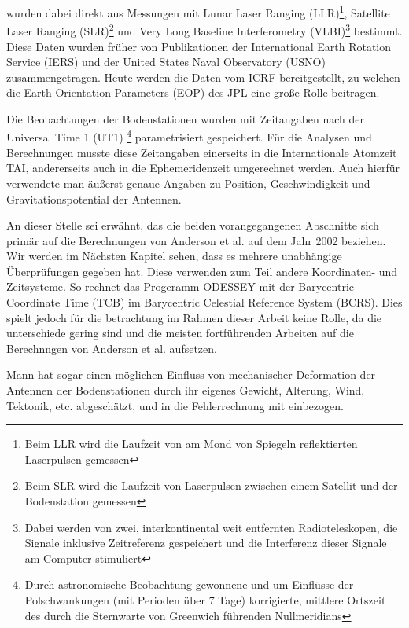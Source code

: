 wurden dabei direkt aus Messungen mit Lunar Laser Ranging (LLR)\footnote{Beim LLR wird die Laufzeit von am Mond von Spiegeln reflektierten Laserpulsen gemessen},
Satellite Laser Ranging (SLR)\footnote{Beim SLR wird die Laufzeit von Laserpulsen zwischen einem Satellit und der Bodenstation gemessen} und Very Long Baseline Interferometry
(VLBI)\footnote{Dabei werden von zwei, interkontinental weit entfernten Radioteleskopen, die Signale inklusive
Zeitreferenz gespeichert und die Interferenz dieser Signale am Computer stimuliert} bestimmt.
Diese Daten wurden früher von Publikationen der International Earth Rotation Service (IERS) und der United States Naval Observatory (USNO) zusammengetragen. Heute werden die Daten vom ICRF bereitgestellt, zu welchen die Earth Orientation Parameters
(EOP) des JPL eine große Rolle beitragen.\cite{Anderson2002}

Die Beobachtungen der Bodenstationen wurden mit Zeitangaben nach der Universal Time 1 (UT1)
\footnote{Durch astronomische Beobachtung gewonnene und um Einflüsse der Polschwankungen (mit Perioden über 7 Tage) korrigierte, mittlere Ortszeit des durch die Sternwarte von Greenwich führenden Nullmeridians}
parametrisiert gespeichert. Für die Analysen und
Berechnungen musste diese Zeitangaben einerseits in die Internationale Atomzeit TAI, andererseits auch in die
Ephemeridenzeit umgerechnet werden. Auch hierfür verwendete man äußerst genaue Angaben zu Position, Geschwindigkeit und
Gravitationspotential der Antennen.\cite{Dittus2006} %

An dieser Stelle sei erwähnt, das die beiden vorangegangenen Abschnitte sich primär auf die Berechnungen von Anderson et al. auf dem Jahr 2002 beziehen.
Wir werden im Nächsten Kapitel sehen, dass es mehrere unabhängige Überprüfungen gegeben hat.
Diese verwenden zum Teil andere Koordinaten- und Zeitsysteme.
So rechnet das Progeramm ODESSEY mit der Barycentric Coordinate Time (TCB) im Barycentric Celestial Reference System (BCRS).
Dies spielt jedoch für die betrachtung im Rahmen dieser Arbeit keine Rolle, da die unterschiede gering sind und die meisten fortführenden Arbeiten auf die Berechnngen von Anderson et al. aufsetzen.	%

Mann hat sogar einen möglichen Einfluss von mechanischer Deformation der Antennen der Bodenstationen durch ihr eigenes Gewicht,
Alterung, Wind, Tektonik, etc. abgeschätzt, und in die Fehlerrechnung mit einbezogen.\cite{Dittus2006} %




